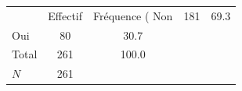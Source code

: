 {
\def\sym#1{\ifmmode^{#1}\else\(^{#1}\)\fi}
\begin{tabular}{l*{1}{cc}}
\toprule
            &    Effectif&Fréquence (%
\midrule
Non         &         181&        69.3\\
Oui         &          80&        30.7\\
Total       &         261&       100.0\\
\midrule
\(N\)       &         261&            \\
\bottomrule
\end{tabular}
}
